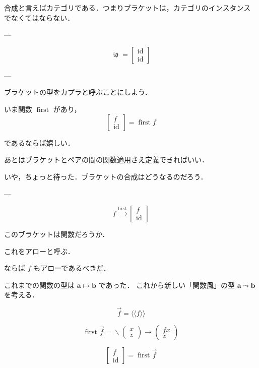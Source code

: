 \documentclass[a5paper,twoside,fleqn,draft]{jsbook}
\newcommand{\Langle}{\langle\!\langle}
\newcommand{\Rangle}{\rangle\!\rangle}
\newcommand{\mSpecialFunc}[1]{#1}
\newcommand{\mVarSpecialFunc}[1]{\mathfrak{#1}}
\DeclareMathOperator{\mFirst}{\mSpecialFunc{first}}
\DeclareMathOperator{\mId}{\mSpecialFunc{id}}
\DeclareMathOperator{\mIdCat}{\mVarSpecialFunc{id}}
\DeclareMathOperator{\mLambda}{\backslash}
\DeclareMathOperator{\mLambdaArrow}{\rightarrow}
\DeclareMathOperator{\mMapsTo}{\mapsto}
\newcommand{\mType}[1]{\mathbf{#1}} %
\newcommand{\mA}{\mType{a}}
\newcommand{\mB}{\mType{b}}
\newcommand{\mArrowWith}[1]{\Langle#1\Rangle}
\newcommand{\mPairWith}[2]{\begin{pmatrix}#1\\#2\end{pmatrix}}
\begin{document}
合成と言えばカテゴリである．つまりブラケットは，カテゴリのインスタンス
でなくてはならない．

---

\begin{equation}
  \mIdCat
  =
  \begin{bmatrix}
    \mId\\
    \mId
  \end{bmatrix}
\end{equation}

---

ブラケットの型をカプラと呼ぶことにしよう．

いま関数 $\mFirst$ があり，
\begin{equation}
  \begin{bmatrix}
    f\\
    \mId
  \end{bmatrix}
  =\mFirst f
\end{equation}


であるならば嬉しい．

あとはブラケットとペアの間の関数適用さえ定義できればいい．

いや，ちょっと待った．ブラケットの合成はどうなるのだろう．

---

\begin{equation}
  f
  \xrightarrow{\mFirst}
  \begin{bmatrix}
    f\\
    \mId
  \end{bmatrix}
\end{equation}

このブラケットは関数だろうか．

これをアローと呼ぶ．

ならば $f$ もアローであるべきだ．

これまでの関数の型は $\mA\mMapsTo\mB$ であった．
これから新しい「関数風」の型 $\mA\leadsto\mB$ を考える．

\begin{equation}
  \Vec{f}
  =\mArrowWith{f}
\end{equation}

\begin{equation}
  \mFirst\Vec{f}
  =\mLambda{\mPairWith{x}{z}}\mLambdaArrow\mPairWith{fx}{z}
\end{equation}

\begin{equation}
  \begin{bmatrix}
    f\\
    \mId
  \end{bmatrix}
  =\mFirst\Vec{f}
\end{equation}
\end{document}

